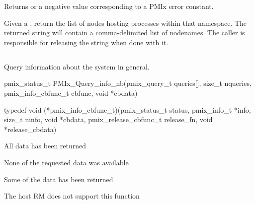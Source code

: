 \begin{arglist}
\end{arglist}

Returns  or a negative value corresponding to a PMIx error constant.

\descr

Given a , return the list of nodes hosting processes within that namespace.
The returned string will contain a comma-delimited list of nodenames.
The caller is responsible for releasing the string when done with it.


\subsection{}

\summary

Query information about the system in general.

\format

\cspecificstart
\begin{codepar}
pmix_status_t
PMIx_Query_info_nb(pmix_query_t queries[], size_t nqueries,
                   pmix_info_cbfunc_t cbfunc, void *cbdata)

typedef void (*pmix_info_cbfunc_t)(pmix_status_t status,
                                   pmix_info_t *info, size_t ninfo,
                                   void *cbdata,
                                   pmix_release_cbfunc_t release_fn,
                                   void *release_cbdata)
\end{codepar}
\cspecificend

\begin{arglist}
\end{arglist}

\begin{constantdesc}
\item {} All data has been returned
\item {} None of the requested data was available
\item {} Some of the data has been returned
\item {} The host \ac{RM} does not support this function
\end{constantdesc}

